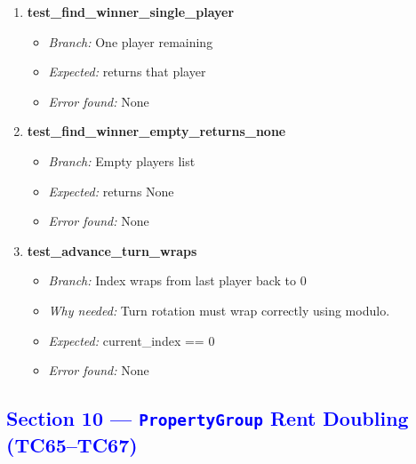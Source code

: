 \documentclass{article}
\begin{document}
\begin{enumerate}[resume, label=\textbf{TC\arabic*.}]
  \item \textbf{test\_find\_winner\_single\_player}
  \begin{itemize}[noitemsep]
    \item \textit{Branch:} One player remaining
    \item \textit{Expected:} returns that player
    \item \textit{Error found:} None
  \end{itemize}

  \item \textbf{test\_find\_winner\_empty\_returns\_none}
  \begin{itemize}[noitemsep]
    \item \textit{Branch:} Empty players list
    \item \textit{Expected:} returns None
    \item \textit{Error found:} None
  \end{itemize}

  \item \textbf{test\_advance\_turn\_wraps}
  \begin{itemize}[noitemsep]
    \item \textit{Branch:} Index wraps from last player back to 0
    \item \textit{Why needed:} Turn rotation must wrap correctly using modulo.
    \item \textit{Expected:} current\_index == 0
    \item \textit{Error found:} None
  \end{itemize}

\end{enumerate}

\subsection*{\textcolor{blue}{Section 10 — \texttt{PropertyGroup} Rent Doubling (TC65--TC67)}}
\end{document}
